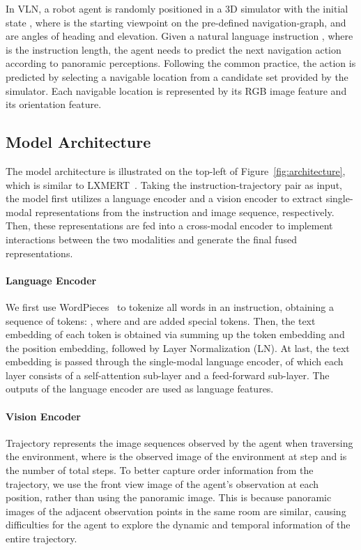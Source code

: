 \documentclass[10pt,twocolumn,letterpaper]{article}
\begin{document}
\vspace{-2pt}
In VLN, a robot agent is randomly positioned in a 3D simulator with the initial state 
, where  is the starting viewpoint on the pre-defined navigation-graph,  and  are angles of heading and elevation.
Given a natural language instruction , where  is the instruction length,
the agent needs to predict the next navigation action according to panoramic perceptions. Following the common practice, the action is predicted by selecting a navigable location from a candidate set provided by the simulator. Each navigable location is represented by its RGB image feature and its orientation feature. 

\subsection{Model Architecture}
The model architecture is illustrated on the top-left of Figure~\ref{fig:architecture}, which is similar to LXMERT~\cite{lxmert}. 
Taking the instruction-trajectory pair as input, the model first utilizes a language encoder and a vision encoder to extract single-modal representations from the instruction and image sequence, respectively. 
Then, these representations are fed into a cross-modal encoder to implement interactions between the two modalities and generate the final fused representations. 

\vspace{-13pt}
\paragraph{Language Encoder} 
We first use WordPieces~\cite{Wordpieces} to tokenize all words in an instruction, obtaining a sequence of tokens: , where  and  are added special tokens. 
Then, the text embedding of each token is obtained via summing up the token embedding and the position embedding, followed by Layer Normalization (LN). At last, the text embedding is passed through the single-modal language encoder, of which each layer consists of a self-attention sub-layer and a feed-forward sub-layer. The outputs of the language encoder are used as language features.

\vspace{-8pt}
\paragraph{Vision Encoder}
Trajectory  represents the image sequences observed by the agent when traversing the environment, where  is the observed image of the environment at step  and  is the number of total steps. To better capture order information from the trajectory, we use the front view image of the agent's observation at each position, rather than using the panoramic image. 
This is because panoramic images of the adjacent observation points in the same room are similar, causing difficulties for the agent to explore the dynamic and temporal information of the entire trajectory.
\end{document}
